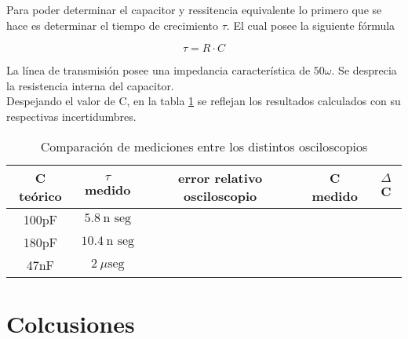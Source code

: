 \documentclass[a4paper,10pt]{article}
\begin{document}
	\indent Para poder determinar el capacitor y ressitencia equivalente lo 
	primero que se hace es determinar el tiempo de crecimiento $\tau$. El cual
	posee la siguiente fórmula

		\begin{equation}
			\tau = R\cdot C
		\end{equation}
	
	\indent La línea de transmisión posee una impedancia característica de 
	$50\omega$. Se desprecia la resistencia interna del capacitor. \\
	\indent Despejando el valor de C, en la tabla \ref{tab002} se reflejan los 
	resultados calculados con su respectivas incertidumbres. \\

		\begin{table}[!htp]
			\centering
			\begin{tabular}{|c|c|c|c|c|}
				\hline
    			C teórico & $\tau$ medido & error relativo osciloscopio & C medido &
				$\Delta$C \\
				\hline
				100pF & $5.8~\text{n seg}$ &  & & \\
				\hline 
				180pF & $10.4~\text{n seg}$ & & & \\
				\hline
				47nF & $2~\mu\text{seg}$ & & & \\
				\hline
			\end{tabular}
			\caption{Comparación de mediciones entre los distintos osciloscopios} 
			\label{tab002} %
		\end{table}

	\newpage
	\section{Colcusiones}
\end{document}
